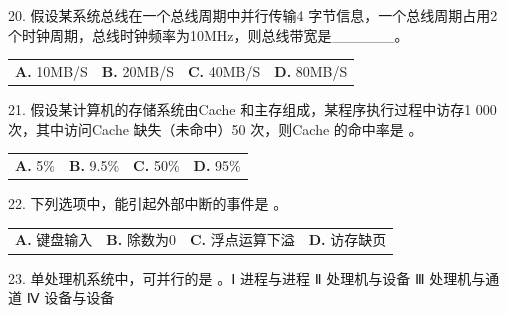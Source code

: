 \documentclass[UTF8,11pt]{ctexart}
\begin{document}
20. 假设某系统总线在一个总线周期中并行传输4 字节信息，一个总线周期占用2 个时钟周期，总线时钟频率为10MHz，则总线带宽是\_\_\_\_\_\_。


\begin{center}\begin{tabular}{>{\raggedright\arraybackslash}p{\dimexpr(\linewidth-8\tabcolsep)/4\relax}>{\raggedright\arraybackslash}p{\dimexpr(\linewidth-8\tabcolsep)/4\relax}>{\raggedright\arraybackslash}p{\dimexpr(\linewidth-8\tabcolsep)/4\relax}>{\raggedright\arraybackslash}p{\dimexpr(\linewidth-8\tabcolsep)/4\relax}}
\textbf{A.} 10MB/S & \textbf{B.} 20MB/S & \textbf{C.} 40MB/S & \textbf{D.} 80MB/S\\[.35em]\end{tabular}\end{center}

21. 假设某计算机的存储系统由Cache 和主存组成，某程序执行过程中访存1 000 次，其中访问Cache 缺失（未命中）50 次，则Cache 的命中率是 。


\begin{center}\begin{tabular}{>{\raggedright\arraybackslash}p{\dimexpr(\linewidth-8\tabcolsep)/4\relax}>{\raggedright\arraybackslash}p{\dimexpr(\linewidth-8\tabcolsep)/4\relax}>{\raggedright\arraybackslash}p{\dimexpr(\linewidth-8\tabcolsep)/4\relax}>{\raggedright\arraybackslash}p{\dimexpr(\linewidth-8\tabcolsep)/4\relax}}
\textbf{A.} 5\% & \textbf{B.} 9.\allowbreak{}5\% & \textbf{C.} 50\% & \textbf{D.} 95\%\\[.35em]\end{tabular}\end{center}

22. 下列选项中，能引起外部中断的事件是 。


\begin{center}\begin{tabular}{>{\raggedright\arraybackslash}p{\dimexpr(\linewidth-8\tabcolsep)/4\relax}>{\raggedright\arraybackslash}p{\dimexpr(\linewidth-8\tabcolsep)/4\relax}>{\raggedright\arraybackslash}p{\dimexpr(\linewidth-8\tabcolsep)/4\relax}>{\raggedright\arraybackslash}p{\dimexpr(\linewidth-8\tabcolsep)/4\relax}}
\textbf{A.} 键盘输入 & \textbf{B.} 除数为0 & \textbf{C.} 浮点运算下溢 & \textbf{D.} 访存缺页\\[.35em]\end{tabular}\end{center}

23. 单处理机系统中，可并行的是 。Ⅰ 进程与进程 Ⅱ 处理机与设备 Ⅲ 处理机与通道 Ⅳ 设备与设备
\end{document}
